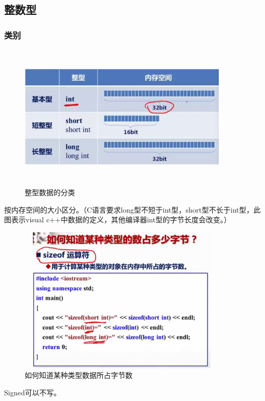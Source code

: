 \documentclass[UTF8]{article}
\begin{document}
\subsection{整数型}




\subsubsection{类别}
\begin{figure}[!htb]
\centering
\includegraphics[width=10cm,height=7cm]{inttype.jpg}
\caption{整型数据的分类}
\hspace{0.05in}
\end{figure}

按内存空间的大小区分。（C语言要求long型不短于int型，short型不长于int型，此图表示visual c++中数据的定义，其他编译器int型的字节长度会改变。）
\begin{figure}[!htb]
\centering
\includegraphics[width=10cm,height=7cm]{printlength.jpg}
\caption{如何知道某种类型数据所占字节数}
\hspace{0.05in}
\end{figure}

Signed可以不写。
\end{document}
